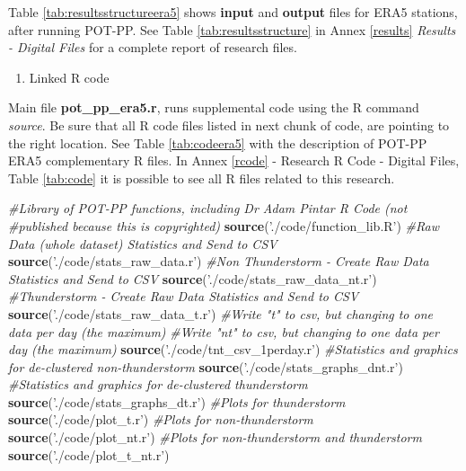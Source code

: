 \documentclass[12pt,twoside]{reedthesis}
\newenvironment{Shaded}{\begin{snugshade}}{\end{snugshade}}
\newcommand{\CommentTok}[1]{\textcolor[rgb]{0.56,0.35,0.01}{\textit{#1}}}
\newcommand{\KeywordTok}[1]{\textcolor[rgb]{0.13,0.29,0.53}{\textbf{#1}}}
\newcommand{\NormalTok}[1]{#1}
\newcommand{\StringTok}[1]{\textcolor[rgb]{0.31,0.60,0.02}{#1}}
\providecommand{\tightlist}{%
  \setlength{\itemsep}{0pt}\setlength{\parskip}{0pt}}
\begin{document}
Table \ref{tab:resultsstructureera5} shows \textbf{input} and \textbf{output} files for ERA5 stations, after running POT-PP. See Table \ref{tab:resultsstructure} in Annex \ref{results} \emph{Results - Digital Files} for a complete report of research files.
\begin{enumerate}
\def\labelenumi{\arabic{enumi}.}
\setcounter{enumi}{2}
\tightlist
\item
  Linked R code
\end{enumerate}
Main file \textbf{pot\_pp\_era5.r}, runs supplemental code using the R command \emph{source}. Be sure that all R code files listed in next chunk of code, are pointing to the right location. See Table \ref{tab:codeera5} with the description of POT-PP ERA5 complementary R files. In Annex \ref{rcode} - Research R Code - Digital Files, Table \ref{tab:code} it is possible to see all R files related to this research.

\scriptsize

\vspace{0.4cm}
\begin{Shaded}
\begin{Highlighting}[]
    \CommentTok{#Library of POT-PP functions, including Dr Adam Pintar R Code (not }
    \CommentTok{#published because this is copyrighted)}
      \KeywordTok{source}\NormalTok{(}\StringTok{'./code/function_lib.R'}\NormalTok{)}
    \CommentTok{#Raw Data (whole dataset) Statistics and Send to CSV }
      \KeywordTok{source}\NormalTok{(}\StringTok{'./code/stats_raw_data.r'}\NormalTok{)}
    \CommentTok{#Non Thunderstorm - Create Raw Data Statistics and Send to CSV }
      \KeywordTok{source}\NormalTok{(}\StringTok{'./code/stats_raw_data_nt.r'}\NormalTok{)}
    \CommentTok{#Thunderstorm - Create Raw Data Statistics and Send to CSV}
      \KeywordTok{source}\NormalTok{(}\StringTok{'./code/stats_raw_data_t.r'}\NormalTok{)}
    \CommentTok{#Write "t" to csv, but changing to one data per day (the maximum)}
    \CommentTok{#Write "nt" to csv, but changing to one data per day (the maximum)}
      \KeywordTok{source}\NormalTok{(}\StringTok{'./code/tnt_csv_1perday.r'}\NormalTok{)}
    \CommentTok{#Statistics and graphics for de-clustered non-thunderstorm}
      \KeywordTok{source}\NormalTok{(}\StringTok{'./code/stats_graphs_dnt.r'}\NormalTok{)}
    \CommentTok{#Statistics and graphics for de-clustered thunderstorm}
      \KeywordTok{source}\NormalTok{(}\StringTok{'./code/stats_graphs_dt.r'}\NormalTok{)}
    \CommentTok{#Plots for thunderstorm}
      \KeywordTok{source}\NormalTok{(}\StringTok{'./code/plot_t.r'}\NormalTok{)}
    \CommentTok{#Plots for non-thunderstorm}
      \KeywordTok{source}\NormalTok{(}\StringTok{'./code/plot_nt.r'}\NormalTok{)}
    \CommentTok{#Plots for non-thunderstorm and thunderstorm}
      \KeywordTok{source}\NormalTok{(}\StringTok{'./code/plot_t_nt.r'}\NormalTok{)}
\end{Highlighting}
\end{Shaded}
\normalsize


\end{document}
